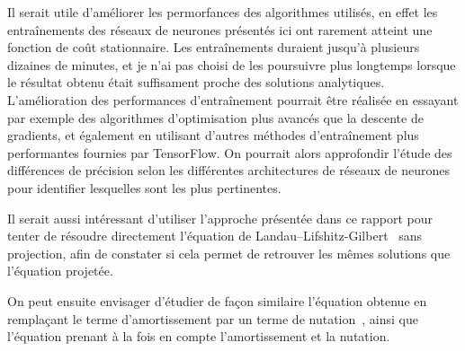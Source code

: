 \documentclass[12pt]{report}
\begin{document}
Il serait utile d'améliorer les permorfances des algorithmes utilisés, en effet les entraînements des réseaux de neurones présentés ici ont rarement atteint une fonction de coût stationnaire. 
Les entraînements duraient jusqu'à plusieurs dizaines de minutes, et je n'ai pas choisi de les poursuivre plus longtemps lorsque le résultat obtenu était suffisament proche des solutions analytiques. 
L'amélioration des performances d'entraînement pourrait être réalisée en essayant par exemple des algorithmes d'optimisation plus avancés que la descente de gradients, et également en utilisant d'autres méthodes d'entraînement plus performantes fournies par TensorFlow.
On pourrait alors approfondir l'étude des différences de précision selon les différentes architectures de réseaux de neurones pour identifier lesquelles sont les plus pertinentes.

Il serait aussi intéressant d'utiliser l'approche présentée dans ce rapport pour tenter de résoudre directement l'équation de Landau--Lifshitz-\-Gilbert~\cite{EquationGilbert} sans projection, afin de constater si cela permet de retrouver les mêmes solutions que l'équation projetée. 

On peut ensuite envisager d'étudier de façon similaire l'équation obtenue en remplaçant le terme d'amortissement par un terme de nutation~\cite{Neeraj2021}, ainsi que l'équation prenant à la fois en compte l'amortissement et la nutation.


\end{document}
